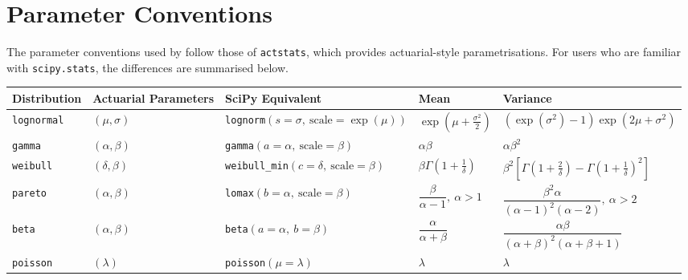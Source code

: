 \section{Parameter Conventions}
\label{app:parameter_conventions}

The parameter conventions used by \actsim follow those of
\texttt{actstats}, which provides actuarial-style parametrisations.
For users who are familiar with \texttt{scipy.stats}, the differences 
are summarised below.

\begin{table}[htbp]
  \centering
  \small
  \renewcommand{\arraystretch}{1.25}
  \begin{tabularx}{\textwidth}{llllX}
  \toprule
  \textbf{Distribution} 
  & \textbf{Actuarial Parameters} 
  & \textbf{SciPy Equivalent} 
  & \textbf{Mean} 
  & \textbf{Variance} \\
  \midrule
  
  \texttt{lognormal} 
  & $(\mu, \sigma)$ 
  & \texttt{lognorm}$(s=\sigma,\ \text{scale}=\exp(\mu))$ 
  & $\exp\left(\mu + \frac{\sigma^2}{2}\right)$ 
  & $\left(\exp(\sigma^2)-1\right)\exp\left(2\mu+\sigma^2\right)$ \\
  
  \texttt{gamma} 
  & $(\alpha, \beta)$ 
  & \texttt{gamma}$(a=\alpha,\ \text{scale}=\beta)$ 
  & $\alpha\beta$ 
  & $\alpha\beta^2$ \\
  
  \texttt{weibull} 
  & $(\delta, \beta)$ 
  & \texttt{weibull\_min}$(c=\delta,\ \text{scale}=\beta)$ 
  & $\beta\Gamma\left(1+\frac{1}{\delta}\right)$ 
  & $\beta^2\left[\Gamma\left(1+\frac{2}{\delta}\right)
  - \Gamma\left(1+\frac{1}{\delta}\right)^2\right]$ \\
  
  \texttt{pareto} 
  & $(\alpha, \beta)$ 
  & \texttt{lomax}$(b=\alpha,\ \text{scale}=\beta)$ 
  & $\dfrac{\beta}{\alpha-1},\ \alpha>1$ 
  & $\dfrac{\beta^2\alpha}{(\alpha-1)^2(\alpha-2)},\ \alpha>2$ \\
  
  \texttt{beta} 
  & $(\alpha, \beta)$ 
  & \texttt{beta}$(a=\alpha,\ b=\beta)$ 
  & $\dfrac{\alpha}{\alpha+\beta}$ 
  & $\dfrac{\alpha\beta}{(\alpha+\beta)^2(\alpha+\beta+1)}$ \\
  
  \texttt{poisson} 
  & $(\lambda)$ 
  & \texttt{poisson}$(\mu=\lambda)$ 
  & $\lambda$ 
  & $\lambda$ \\
  

\end{tabularx}
\end{table}
